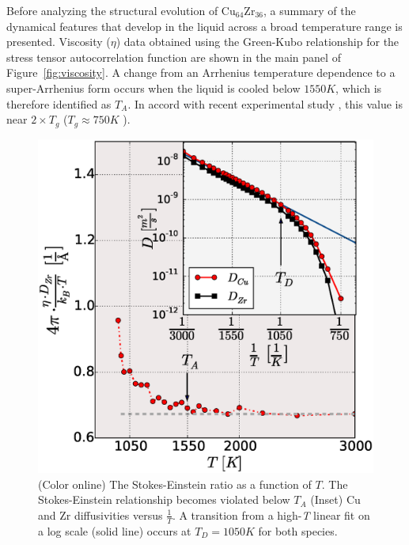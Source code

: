 \documentclass[aps,prl,preprint,showpacs,amsmath,floatfix,superscriptaddress]{revtex4}
\begin{document}
Before analyzing the structural evolution of
$\mathrm{Cu_{64}Zr_{36}}$, a summary of the dynamical features
that develop in the liquid across a broad temperature range is presented.
Viscosity ($\eta$) data obtained using the Green-Kubo relationship for the
stress tensor autocorrelation function \cite{Hansen2006}
are shown in the main panel of Figure~\ref{fig:viscosity}. A
change from an Arrhenius temperature dependence to a
super-Arrhenius form occurs when the liquid is cooled below $1550
K$, which is therefore identified as $T_{A}$. In accord with
recent experimental study \cite{Kelton2014}, this value is near $2
\times T_{g}$ ($T_{g} \approx 750 K$ \cite{Mendelev2009}).

\begin{figure}[t]
\includegraphics[scale=0.43]{stokes-diff-test.eps}
\caption{(Color online) The Stokes-Einstein ratio as a function of
$T$. The Stokes-Einstein relationship becomes violated below $T_{A}$
(Inset) Cu and Zr diffusivities versus $\frac{1}{T}$. A
transition from a high-\textit{T} linear fit on a log scale (solid line)
occurs at $T_{D} = 1050 K$ for both species.}
\label{fig:diffusivity}
\end{figure}
\end{document}
